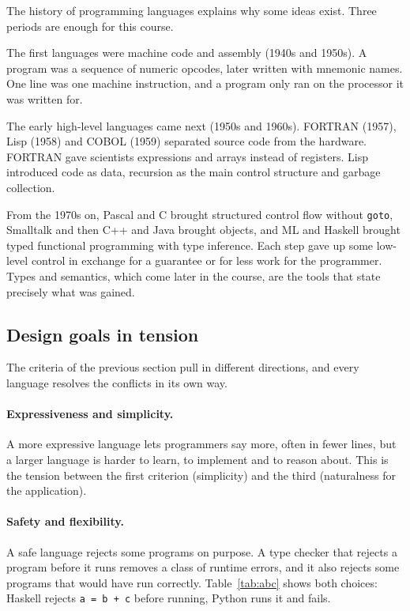 The history of programming languages explains why some ideas exist. Three
periods are enough for this course.

The first languages were machine code and assembly (1940s and 1950s). A
program was a sequence of numeric opcodes, later written with mnemonic names.
One line was one machine instruction, and a program only ran on the processor
it was written for.

The early high-level languages came next (1950s and 1960s). FORTRAN (1957),
Lisp (1958) and COBOL (1959) separated source code from the hardware. FORTRAN
gave scientists expressions and arrays instead of registers. Lisp introduced
code as data, recursion as the main control structure and garbage collection.

From the 1970s on, Pascal and C brought structured control flow without
\texttt{goto}, Smalltalk and then C++ and Java brought objects, and ML and
Haskell brought typed functional programming with type inference. Each step
gave up some low-level control in exchange for a guarantee or for less work
for the programmer. Types and semantics, which come later in the course, are
the tools that state precisely what was gained.

\subsection{Design goals in tension}

The criteria of the previous section pull in different directions, and every
language resolves the conflicts in its own way.

\paragraph{Expressiveness and simplicity.} A more expressive language lets
programmers say more, often in fewer lines, but a larger language is harder to
learn, to implement and to reason about. This is the tension between the first
criterion (simplicity) and the third (naturalness for the application).

\paragraph{Safety and flexibility.} A safe language rejects some programs on
purpose. A type checker that rejects a program before it runs removes a class
of runtime errors, and it also rejects some programs that would have run
correctly. Table~\ref{tab:abc} shows both choices: Haskell rejects
\texttt{a = b + c} before running, Python runs it and fails.

